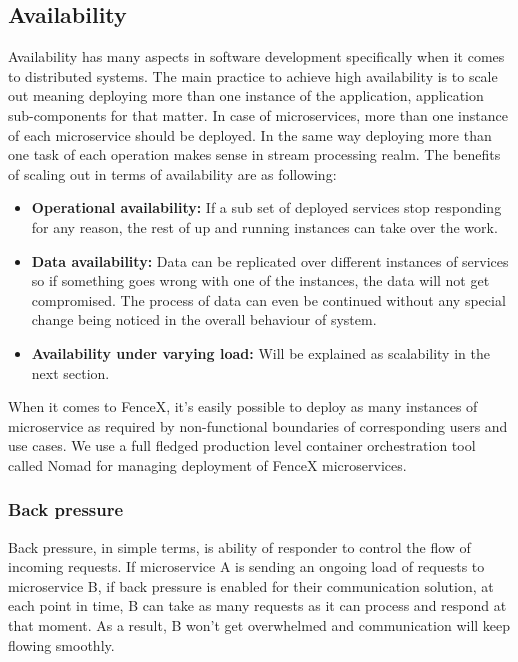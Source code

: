 \documentclass[a4]{report}
\begin{document}
    \subsection{Availability}
    Availability has many aspects in software development specifically when it comes to distributed systems.
    The main practice to achieve high availability is to scale out meaning deploying more than one instance of the
    application, application sub-components for that matter.
    In case of microservices, more than one instance of each microservice should be deployed.
    In the same way deploying more than one task of each operation makes sense in stream processing realm.
    The benefits of scaling out in terms of availability are as following:
    \begin{itemize}
        \item \textbf{Operational availability:} If a sub set of deployed services stop responding for any
        reason, the rest of up and running instances can take over the work.
        \item \textbf{Data availability:} Data can be replicated over different instances of services so if
        something goes wrong with one of the instances, the data will not get compromised.
        The process of data can even be continued without any special change being noticed in the overall behaviour of
        system.
        \item \textbf{Availability under varying load:} Will be explained as scalability in the next section.
    \end{itemize}

    When it comes to FenceX, it's easily possible to deploy as many instances of microservice as required by
    non-functional boundaries of corresponding users and use cases.
    We use a full fledged production level container orchestration tool called Nomad\cite{nomad} for managing deployment of
    FenceX microservices.

    \subsubsection{Back pressure}
    Back pressure\cite{reactive-manifesto}, in simple terms, is ability of responder to control the flow of incoming requests.
    If microservice A is sending an ongoing load of requests to microservice B, if back pressure is enabled for
    their communication solution, at each point in time, B can take as many requests as it can process and respond at
    that moment.
    As a result, B won't get overwhelmed and communication will keep flowing smoothly.
\end{document}
